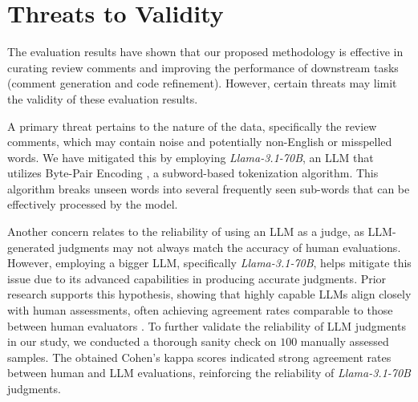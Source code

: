 \section{Threats to Validity}
\label{sec:threats}

The evaluation results have shown that our proposed methodology is effective in curating review comments and improving the performance of downstream tasks (\ie comment generation and code refinement). However, certain threats may limit the validity of these evaluation results.


A primary threat pertains to the nature of the data, specifically the review comments, which may contain noise and potentially non-English or misspelled words. We have mitigated this by employing \emph{Llama-3.1-70B}, an LLM that utilizes Byte-Pair Encoding \cite{sennrich2015neural}, a subword-based tokenization algorithm. This algorithm breaks unseen words into several frequently seen sub-words that can be effectively processed by the model.

Another concern relates to the reliability of using an LLM as a judge, as LLM-generated judgments may not always match the accuracy of human evaluations. However, employing a bigger LLM, specifically \emph{Llama-3.1-70B}, helps mitigate this issue due to its advanced capabilities in producing accurate judgments. Prior research supports this hypothesis, showing that highly capable LLMs align closely with human assessments, often achieving agreement rates comparable to those between human evaluators \cite{zheng2024judging, li2023alpacaeval}. To further validate the reliability of LLM judgments in our study, we conducted a thorough sanity check on $100$ manually assessed samples. The obtained Cohen's kappa scores indicated strong agreement rates between human and LLM evaluations, reinforcing the reliability of \emph{Llama-3.1-70B} judgments.






